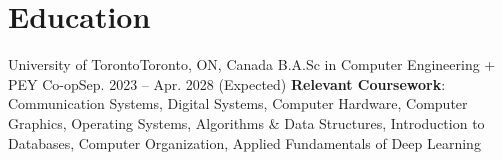 
\section{Education}
\resumeSubHeadingListStart
\resumeSubheading
{University of Toronto}{Toronto, ON, Canada}
{B.A.Sc in Computer Engineering + PEY Co-op}{Sep. 2023 -- Apr. 2028 (Expected)}
\resumeSubHeadingListEnd
{
  \small \textbf{Relevant Coursework}:
  Communication Systems,
  Digital Systems,
  Computer Hardware,
  Computer Graphics,
  Operating Systems,
  Algorithms \& Data Structures,
  Introduction to Databases,
  Computer Organization,
  Applied Fundamentals of Deep Learning
}
